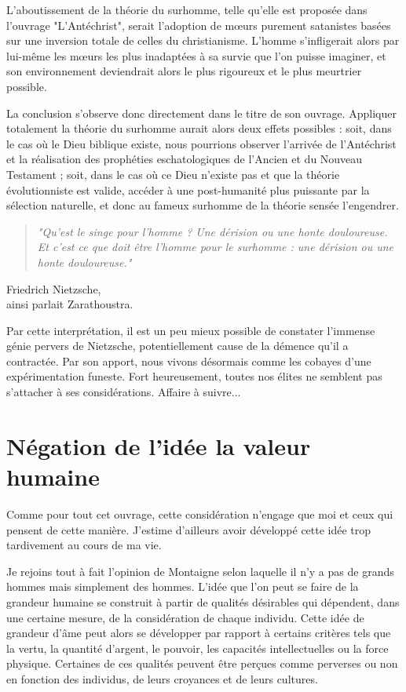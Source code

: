 L’aboutissement de la théorie du surhomme, telle qu’elle est proposée dans l’ouvrage "L'Antéchrist", serait l’adoption de mœurs purement satanistes basées sur une inversion totale de celles du christianisme. L’homme s’infligerait alors par lui-même les mœurs les plus inadaptées à sa survie que l’on puisse imaginer, et son environnement deviendrait alors le plus rigoureux et le plus meurtrier possible.

La conclusion s’observe donc directement dans le titre de son ouvrage. Appliquer totalement la théorie du surhomme aurait alors deux effets possibles : soit, dans le cas où le Dieu biblique existe, nous pourrions observer l’arrivée de l’Antéchrist et la réalisation des prophéties eschatologiques de l’Ancien et du Nouveau Testament ; soit, dans le cas où ce Dieu n’existe pas et que la théorie évolutionniste est valide, accéder à une post-humanité plus puissante par la sélection naturelle, et donc au fameux surhomme de la théorie sensée l'engendrer.

\begin{center}
\begin{quote}
\textit{"Qu’est le singe pour l’homme ? Une dérision ou une honte douloureuse. Et c’est ce que doit être l’homme pour le surhomme : une dérision ou une honte douloureuse."}\end{quote} Friedrich Nietzsche, \\ ainsi parlait Zarathoustra.
\end{center}

Par cette interprétation, il est un peu mieux possible de constater l’immense génie pervers de Nietzsche, potentiellement cause de la démence qu’il a contractée. Par son apport, nous vivons désormais comme les cobayes d'une expérimentation funeste. Fort heureusement, toutes nos élites ne semblent pas s'attacher à ses considérations. Affaire à suivre...


\chapter{Négation de l’idée la valeur humaine}

Comme pour tout cet ouvrage, cette considération n’engage que moi et ceux qui pensent de cette manière. J’estime d’ailleurs avoir développé cette idée trop tardivement au cours de ma vie.

Je rejoins tout à fait l’opinion de Montaigne selon laquelle il n’y a pas de grands hommes mais simplement des hommes. L’idée que l’on peut se faire de la grandeur humaine se construit à partir de qualités désirables qui dépendent, dans une certaine mesure, de la considération de chaque individu. Cette idée de grandeur d’âme peut alors se développer par rapport à certains critères tels que la vertu, la quantité d’argent, le pouvoir, les capacités intellectuelles ou la force physique. Certaines de ces qualités peuvent être perçues comme perverses ou non en fonction des individus, de leurs croyances et de leurs cultures.

